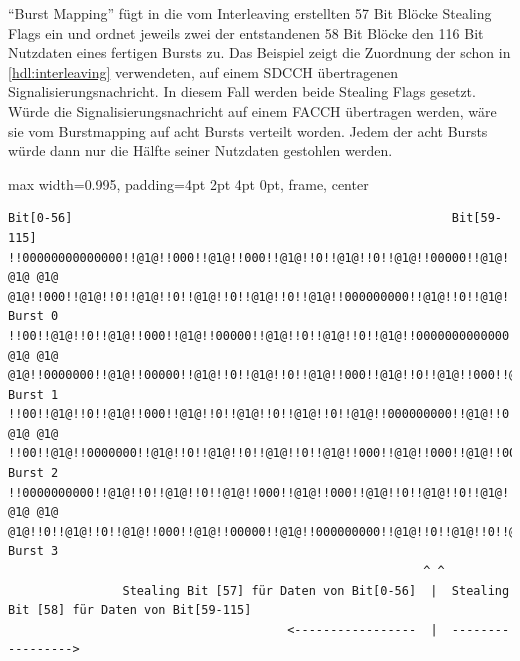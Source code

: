 "`Burst Mapping"' fügt in die vom Interleaving erstellten 57 Bit Blöcke Stealing Flags ein und ordnet jeweils zwei der entstandenen 58 Bit Blöcke den 116 Bit Nutzdaten eines fertigen Bursts zu. Das Beispiel zeigt die Zuordnung der schon in \autoref{hdl:interleaving} verwendeten, auf einem \ac{SDCCH} übertragenen Signalisierungsnachricht. In diesem Fall werden beide Stealing Flags gesetzt. Würde die Signalisierungsnachricht auf einem \ac{FACCH} übertragen werden, wäre sie vom Burstmapping auf acht Bursts verteilt worden. Jedem der acht Bursts würde dann nur die Hälfte seiner Nutzdaten gestohlen werden.\\

\begin{samepage}
\begin{adjustbox}{max width={0.995\textwidth}, padding=4pt 2pt 4pt 0pt, frame, center}
\begin{lstlisting}[language=bytetxt, numbers=none]
Bit[0-56]                                                     Bit[59-115]
!!00000000000000!!@1@!!000!!@1@!!000!!@1@!!0!!@1@!!0!!@1@!!00000!!@1@!!00000!!@1@!!0!!@1@!!0!!@1@!!0!!@1@!!000!!@1@!!000!!@1@!!000!!@1@ @1@ @1@ @1@!!000!!@1@!!0!!@1@!!0!!@1@!!0!!@1@!!0!!@1@!!000000000!!@1@!!0!!@1@!!0!!@1@!!0!!@1@!!000!!@1@!!000!!@1@!!0!!@1@!!00000!!@1@!!000000000000!! Burst 0
!!00!!@1@!!0!!@1@!!000!!@1@!!00000!!@1@!!0!!@1@!!0!!@1@!!0000000000000!!@1@!!0!!@1@!!0!!@1@!!000!!@1@!!000!!@1@!!0!!@1@!!0!!@1@!!000!!@1@!!0!!@1@!!00!! @1@ @1@ @1@!!0000000!!@1@!!00000!!@1@!!0!!@1@!!0!!@1@!!000!!@1@!!0!!@1@!!000!!@1@!!00000!!@1@!!0!!@1@!!00000!!@1@!!0!!@1@!!0!!@1@!!000!!@1@!!0!!@1@!!0000!! Burst 1
!!00!!@1@!!0!!@1@!!000!!@1@!!0!!@1@!!0!!@1@!!0!!@1@!!000000000!!@1@!!0!!@1@!!0!!@1@!!00000000000!!@1@!!0!!@1@!!000000000!!@1@!!000!!@1@ @1@ @1@ !!00!!@1@!!0000000!!@1@!!0!!@1@!!0!!@1@!!0!!@1@!!000!!@1@!!000!!@1@!!00000!!@1@!!0!!@1@!!0000000!!@1@!!0!!@1@!!0!!@1@!!000!!@1@!!0!!@1@!!000000!! Burst 2
!!0000000000!!@1@!!0!!@1@!!0!!@1@!!000!!@1@!!000!!@1@!!0!!@1@!!0!!@1@!!0000000000000!!@1@!!0!!@1@!!0!!@1@!!0!!@1@!!0!!@1@!!00000000!! @1@ @1@ @1@!!0!!@1@!!0!!@1@!!000!!@1@!!00000!!@1@!!000000000!!@1@!!0!!@1@!!0!!@1@!!00000!!@1@!!0000000!!@1@!!0!!@1@!!0!!@1@!!0!!@1@!!0!!@1@!!000!!@1@!!00!! Burst 3
                                                          ^ ^
                Stealing Bit [57] für Daten von Bit[0-56]  |  Stealing Bit [58] für Daten von Bit[59-115]                                                           
                                       <-----------------  |  -----------------> 
\end{lstlisting}
\end{adjustbox}
\begin{lstlisting}[caption={[Zuordnung von Testdaten zu Bursts auf dem SDCCH durch Burstmapping]Zuordnung von Testdaten zu Bursts auf dem \ac{SDCCH} durch Burstmapping, Datensatz generiert mit \texttt{dummycoder} (siehe \autoref{hdl:coder-impl})}, basicstyle=\tiny]
\end{lstlisting}
\end{samepage}

